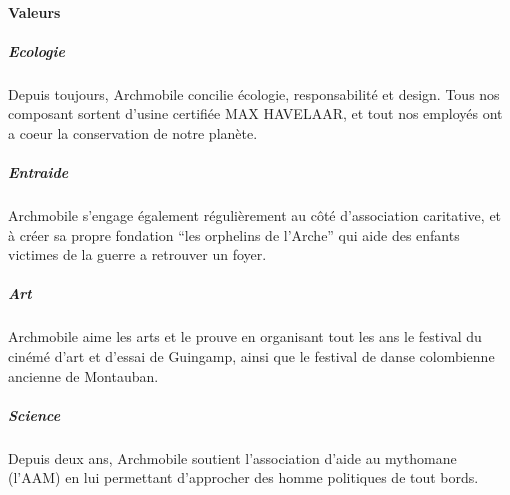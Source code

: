 \paragraph{Valeurs}
\subparagraph{Ecologie}
Depuis toujours, Archmobile concilie écologie, responsabilité et
design. Tous nos composant sortent d'usine certifiée MAX HAVELAAR, et
tout nos employés ont a coeur la conservation de notre planète.
\subparagraph{Entraide}
Archmobile s'engage également régulièrement au côté d'association
caritative, et à créer sa propre fondation ``les orphelins de
l'Arche'' qui aide des enfants victimes de la guerre a retrouver un
foyer.
\subparagraph{Art}
Archmobile aime les arts et le prouve en organisant tout les ans le
festival du cinémé d'art et d'essai de Guingamp, ainsi que le festival
de danse colombienne ancienne de Montauban.
\subparagraph{Science}
Depuis deux ans, Archmobile soutient l'association d'aide au mythomane
(l'AAM) en lui permettant d'approcher des homme politiques de tout
bords.
